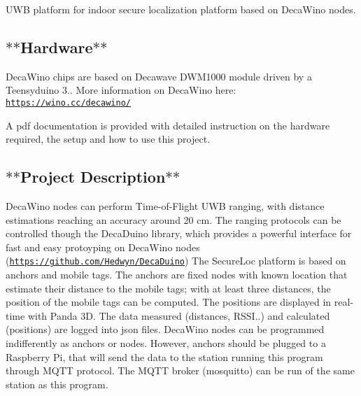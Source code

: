 U\+WB platform for indoor secure localization platform based on Deca\+Wino nodes.

\subsection*{$\ast$$\ast$\+Hardware$\ast$$\ast$}

Deca\+Wino chips are based on Decawave D\+W\+M1000 module driven by a Teensyduino 3.. More information on Deca\+Wino here\+: \href{https://wino.cc/decawino/}{\tt https\+://wino.\+cc/decawino/}

A pdf documentation is provided with detailed instruction on the hardware required, the setup and how to use this project.

\subsection*{$\ast$$\ast$\+Project Description$\ast$$\ast$}

Deca\+Wino nodes can perform Time-\/of-\/\+Flight U\+WB ranging, with distance estimations reaching an accuracy around 20 cm. The ranging protocols can be controlled though the Deca\+Duino library, which provides a powerful interface for fast and easy protoyping on Deca\+Wino nodes (\href{https://github.com/Hedwyn/DecaDuino}{\tt https\+://github.\+com/\+Hedwyn/\+Deca\+Duino}) The Secure\+Loc platform is based on anchors and mobile tags. The anchors are fixed nodes with known location that estimate their distance to the mobile tags; with at least three distances, the position of the mobile tags can be computed. The positions are displayed in real-\/time with Panda 3D. The data measured (distances, R\+S\+SI..) and calculated (positions) are logged into json files. Deca\+Wino nodes can be programmed indifferently as anchors or nodes. However, anchors should be plugged to a Raspberry Pi, that will send the data to the station running this program through M\+Q\+TT protocol. The M\+Q\+TT broker (mosquitto) can be run of the same station as this program.

